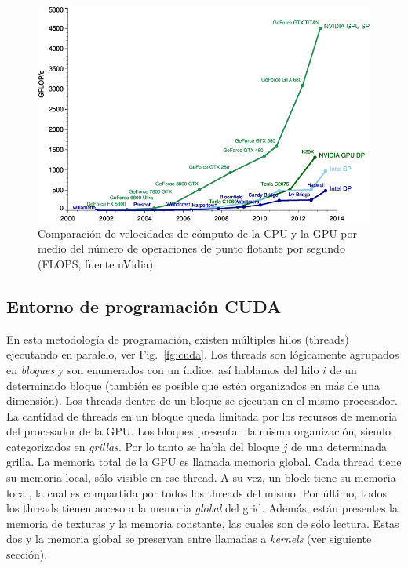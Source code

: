 \begin{figure}[h]
\begin{center}
\includegraphics[width=12cm]{figures/cpugpu}
\end{center}
\caption{Comparación de velocidades de cómputo de la CPU y la GPU por medio del número de operaciones de punto flotante por segundo (FLOPS, fuente nVidia).}
\label{fg:cpugpu}
\end{figure}



\subsection{Entorno de programación CUDA}
En esta metodolog\'ia de programaci\'on, existen m\'ultiples hilos (threads) ejecutando en paralelo, ver Fig.~\ref{fg:cuda}.
Los threads son l\'ogicamente agrupados en {\em bloques} y son enumerados con un \'indice, as\'i hablamos del hilo $i$ de un determinado bloque (también es posible que estén organizados en más de una dimensión).
Los threads dentro de un bloque se ejecutan en el mismo procesador.
La cantidad de threads en un bloque queda limitada por los recursos de memoria del procesador de la GPU. Los bloques presentan la misma organizaci\'on, siendo categorizados en {\em grillas}. 
Por lo tanto se habla del bloque $j$ de una determinada grilla.
La memoria total de la GPU es llamada memoria global. Cada thread tiene su memoria local, s\'olo visible en ese thread.
A su vez, un block tiene su memoria local, la cual es compartida por todos los threads del mismo.
Por \'ultimo, todos los threads tienen acceso a la memoria {\em global} del grid.
Adem\'as, est\'an presentes la memoria de texturas y la memoria constante, las cuales son de s\'olo lectura.
Estas dos y la memoria global se preservan entre llamadas a {\em kernels} (ver siguiente secci\'on).

